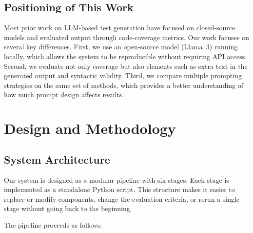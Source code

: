 \documentclass[conference]{IEEEtran}
\begin{document}
\subsection{Positioning of This Work}

Most prior work on LLM-based test generation have focused on closed-source models and evaluated output through code-coverage metrics. Our work focuses on several key differences. First, we use an open-source model (Llama~3) running locally, which allows the system to be reproducible without requiring API access. Second, we evaluate not only coverage but also elements such as extra text in the generated output and syntactic validity. Third, we compare multiple prompting strategies on the same set of methods, which provides a better understanding of how much prompt design affects results.

\section{Design and Methodology}

\subsection{System Architecture}

Our system is designed as a modular pipeline with six stages. Each stage is implemented as a standalone Python script. This structure makes it easier to replace or modify components, change the evaluation criteria, or rerun a single stage without going back to the beginning.

The pipeline proceeds as follows:
\end{document}
